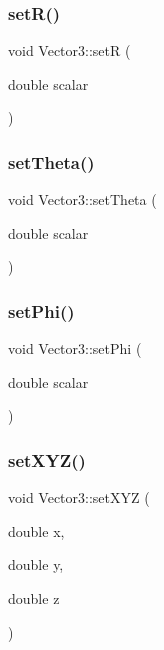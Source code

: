 \mbox{\label{class_vector3_a9beef32ceaebce5bd595fd016e65be4f}} 
\subsubsection{\texorpdfstring{setR()}{setR()}}
{\footnotesize\ttfamily void Vector3\+::setR (\begin{DoxyParamCaption}\item[{double}]{scalar }\end{DoxyParamCaption})\hspace{0.3cm}{\ttfamily [inline]}}

\mbox{\label{class_vector3_a55a6be6dca9ee66a9bfe497ac8a0c13f}} 
\subsubsection{\texorpdfstring{setTheta()}{setTheta()}}
{\footnotesize\ttfamily void Vector3\+::set\+Theta (\begin{DoxyParamCaption}\item[{double}]{scalar }\end{DoxyParamCaption})\hspace{0.3cm}{\ttfamily [inline]}}

\mbox{\label{class_vector3_a6a5aa0401fbcc6cfcde68ba486153b16}} 
\subsubsection{\texorpdfstring{setPhi()}{setPhi()}}
{\footnotesize\ttfamily void Vector3\+::set\+Phi (\begin{DoxyParamCaption}\item[{double}]{scalar }\end{DoxyParamCaption})\hspace{0.3cm}{\ttfamily [inline]}}

\mbox{\label{class_vector3_accc0a2a83b45ba13ba0bc9f238e6d103}} 
\subsubsection{\texorpdfstring{setXYZ()}{setXYZ()}}
{\footnotesize\ttfamily void Vector3\+::set\+X\+YZ (\begin{DoxyParamCaption}\item[{double}]{x,  }\item[{double}]{y,  }\item[{double}]{z }\end{DoxyParamCaption})\hspace{0.3cm}{\ttfamily [inline]}}

